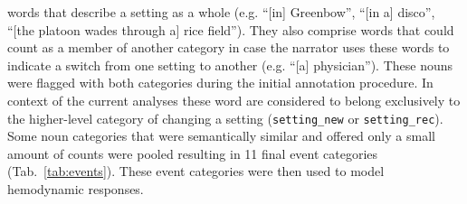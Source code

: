 \documentclass[english]{article}
\begin{document}
words that describe a setting as a whole (e.g. ``[in] Greenbow'', ``[in a]
disco'', ``[the platoon wades through a] rice field''). They also comprise words
that could count as a member of another category in case the narrator uses these
words to indicate a switch from one setting to another (e.g. ``[a] physician'').
These nouns were flagged with both categories during the initial annotation
procedure. In context of the current analyses these word are considered to
belong exclusively to the higher-level category of changing a setting
(\texttt{setting\_new} or \texttt{setting\_rec}).
Some noun categories that were semantically similar and offered only a small
amount of counts were pooled resulting in 11 final event categories
(Tab.~\ref{tab:events}).  These event categories were then used to model
hemodynamic responses.
\end{document}
